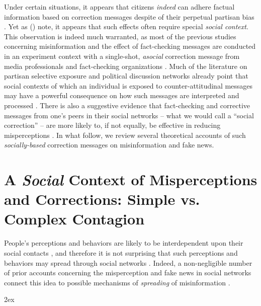 \documentclass[man, 12pt, a4paper]{apa6}
\begin{document}
        Under certain situations, it appears that citizens \emph{indeed} can adhere factual information based on correction messages despite of their perpetual partisan bias \parencite[e.g.,][]{Wood2018, Garrett_Weeks_2013, weeks2015emotions}. Yet as \citeauthor{margolin2017} (\citeyear{margolin2017}) note, it appears that such effects often require special \emph{social context}. This observation is indeed much warranted, as most of the previous studies concerning misinformation and the effect of fact-checking messages are conducted in an experiment context with a single-shot, \emph{asocial} correction message from media professionals and fact-checking organizations \parencite[e.g.,][]{nyhan2010corrections,garrett2013undermining,weeks2015emotions}. Much of the literature on partisan selective exposure and political discussion networks already point that social contexts of which an individual is exposed to counter-attitudinal messages may have a powerful consequence on how such messages are interpreted and processed \parencite{messing2014selective, levitan2014seeking, levitan2008resistance}. There is also a suggestive evidence that fact-checking and corrective messages from one's peers in their social networks -- what we would call a \enquote{social correction} -- are more likely to, if not equally, be effective in reducing misperceptions \parencite[e.g.,][]{margolin2017, bode2017see}. In what follow, we review several theoretical accounts of such \emph{socially-based} correction messages on misinformation and fake news.   
      
\section{A \emph{Social} Context of Misperceptions and Corrections: Simple vs. Complex Contagion}

  People's perceptions and behaviors are likely to be interdependent upon their social contacts \parencite{lazer2010coevolution, centola2007complex}, and therefore it is not surprising that such perceptions and behaviors may spread through social networks \parencite[e.g.,][]{christakis2007spread, bond_61million}. Indeed, a non-negligible number of prior accounts concerning the misperception and fake news in social networks connect this idea to possible mechanisms of \emph{spreading} of misinformation \parencite[e.g.,][]{del2016spreading, lazer2017combating, Bessi_2015}.  
    
    



\printbibliography
\newpage
\begingroup
\parindent 0pt
\parskip 2ex
\def\enotesize{\normalsize}
\theendnotes
\endgroup
\end{document}
